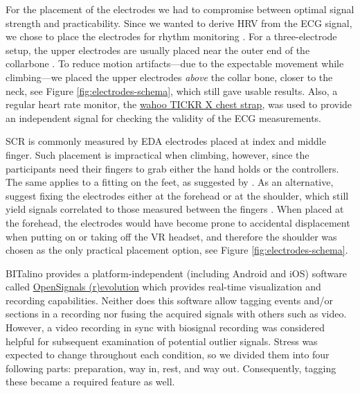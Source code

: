 For the placement of the electrodes we had to compromise between optimal signal strength and practicability. Since we wanted to derive \gls{HRV} from the \gls{ECG} signal, we chose to place the electrodes for rhythm monitoring \autocite{ECGLeadPlacement2015}. For a three-electrode setup, the upper electrodes are usually placed near the outer end of the collarbone \autocite{Klabunde2017,EKGPlatzierung2007}. To reduce motion artifacts---due to the expectable movement while climbing---we placed the upper electrodes \textit{above} the collar bone, closer to the neck, see Figure \ref{fig:electrodes-schema}, which still gave usable results. Also, a regular heart rate monitor, the \href{https://de-eu.wahoofitness.com/devices/heart-rate-monitors/wahoo-tickr-x-heart-rate-strap}{wahoo TICKR X chest strap}, was used to provide an independent signal for checking the validity of the \gls{ECG} measurements.

\Gls{SCR} is commonly measured by \gls{EDA} electrodes placed at index and middle finger. Such placement is impractical when climbing, however, since the participants need their fingers to grab either the hand holds or the controllers. The same applies to a fitting on the feet, as suggested by \textcite{Bertle2014}. As an alternative, \textcite{vanDooren2012} suggest fixing the electrodes either at the forehead or at the shoulder, which still yield signals correlated to those measured between the fingers \autocite{vanDooren2012}. When placed at the forehead, the electrodes would have become prone to accidental displacement when putting on or taking off the \gls{VR} headset, and therefore the shoulder was chosen as the only practical placement option, see Figure \ref{fig:electrodes-schema}.



BITalino provides a platform-independent (including Android and iOS) software called \href{http://bitalino.com/en/software}{OpenSignals (r)evolution} which provides real-time visualization and recording capabilities. Neither does this software allow tagging events and/or sections in a recording nor fusing the acquired signals with others such as video. However, a video recording in sync with biosignal recording was considered helpful for subsequent examination of potential outlier signals. Stress was expected to change throughout each condition, so we divided them into four following parts: preparation, way in, rest, and way out. Consequently, tagging these became a required feature as well.

